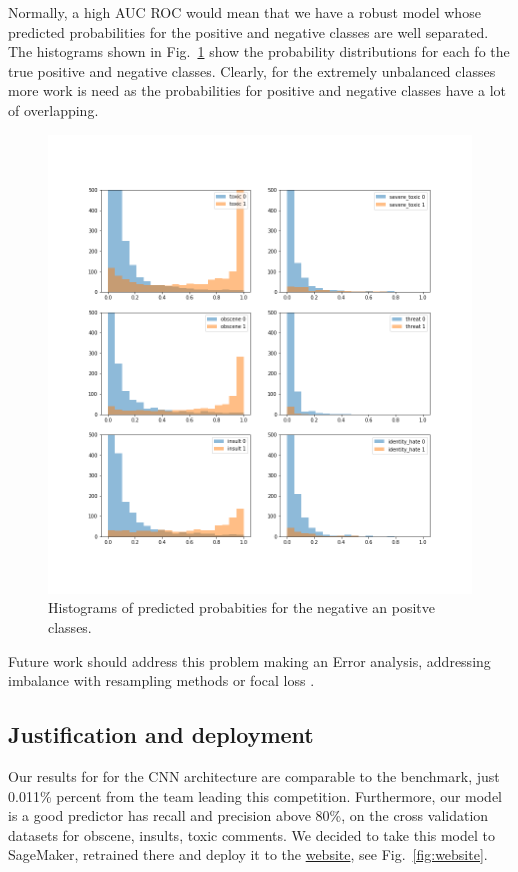 \documentclass{report}
\begin{document}
Normally, a high AUC ROC would mean that we have a robust model 
whose predicted probabilities for the positive and negative classes 
are well separated. The histograms shown in  Fig.~\ref{fig:pdfs} show 
the probability distributions for each fo the true positive and negative classes. Clearly, 
for the extremely unbalanced classes more work is need as the probabilities 
for positive and negative classes have a lot of overlapping. 
\begin{figure}[!h]
\centering
  \includegraphics[width=160mm]{../local/plots_tables/pdfs.png}
  \caption{Histograms of predicted probabities for the negative an positve classes. }
  \label{fig:pdfs}
\end{figure}
Future work should address this problem making an Error analysis, addressing imbalance with 
resampling methods or focal loss \cite{focal}. 

\subsection{Justification and deployment}

Our results for for the CNN architecture are comparable to the benchmark, just 0.011\% percent
from the team leading this competition. Furthermore, our model is a good predictor 
has recall and precision above 80\%, on the cross validation datasets for obscene, insults, toxic comments. 
We decided to take this model to SageMaker, retrained there and deploy it to 
the \href{https://reneang17.github.io/The-speech-of-fake-news/}{website}, see Fig.~\ref{fig:website}. 
\end{document}
